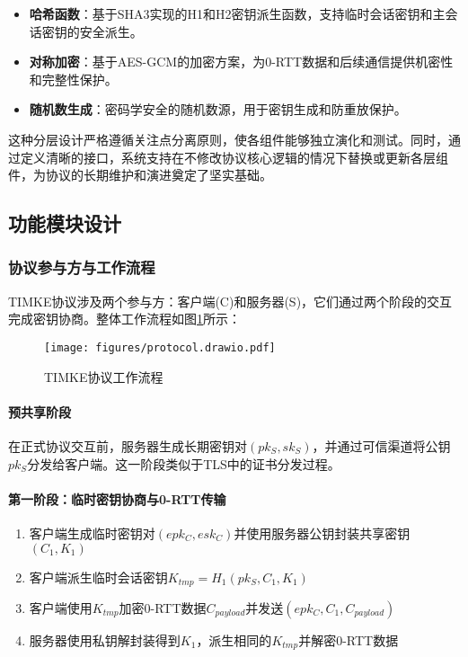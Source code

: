 \begin{itemize}
    \item \textbf{哈希函数}：基于SHA3实现的H1和H2密钥派生函数，支持临时会话密钥和主会话密钥的安全派生。
    
    \item \textbf{对称加密}：基于AES-GCM的加密方案，为0-RTT数据和后续通信提供机密性和完整性保护。
    
    \item \textbf{随机数生成}：密码学安全的随机数源，用于密钥生成和防重放保护。
\end{itemize}

这种分层设计严格遵循关注点分离原则，使各组件能够独立演化和测试。同时，通过定义清晰的接口，系统支持在不修改协议核心逻辑的情况下替换或更新各层组件，为协议的长期维护和演进奠定了坚实基础。

\subsection{功能模块设计}

\subsubsection{协议参与方与工作流程}

TIMKE协议涉及两个参与方：客户端(C)和服务器(S)，它们通过两个阶段的交互完成密钥协商。整体工作流程如图\ref{fig:protocol-flow}所示：

\begin{figure}[H]
  \centering
  \texttt{[image: figures/protocol.drawio.pdf]}
  \caption{TIMKE协议工作流程}
  \label{fig:protocol-flow}
\end{figure}

\paragraph{预共享阶段}
在正式协议交互前，服务器生成长期密钥对$(pk_S, sk_S)$，并通过可信渠道将公钥$pk_S$分发给客户端。这一阶段类似于TLS中的证书分发过程。

\paragraph{第一阶段：临时密钥协商与0-RTT传输}
\begin{enumerate}
    \item 客户端生成临时密钥对$(epk_C, esk_C)$并使用服务器公钥封装共享密钥$(C_1, K_1)$
    \item 客户端派生临时会话密钥$K_{tmp} = H_1(pk_S, C_1, K_1)$
    \item 客户端使用$K_{tmp}$加密0-RTT数据$C_{payload}$并发送$(epk_C, C_1, C_{payload})$
    \item 服务器使用私钥解封装得到$K_1$，派生相同的$K_{tmp}$并解密0-RTT数据
\end{enumerate}

